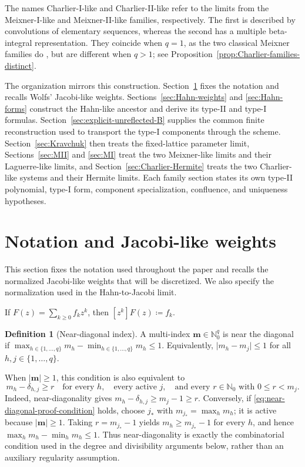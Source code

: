 \documentclass[10pt]{amsart}
\newcommand{\Nzero}{\mathbb N_0}
\newcommand{\mm}{\boldsymbol m}
\newcommand{\abs}[1]{\lvert#1\rvert}
\theoremstyle{plain}
\theoremstyle{definition}
\newtheorem{definition}[theorem]{Definition}
\theoremstyle{remark}
\begin{document}
The names Charlier-I-like and Charlier-II-like refer to the limits from the
Meixner-I-like and Meixner-II-like families, respectively. The first is
described by convolutions of elementary sequences, whereas the second has
a multiple beta-integral representation. They coincide when \(q=1\), as
the two classical Meixner families do
\cite{ArvesuCoussementVanAssche2003}, but are different when \(q>1\); see
Proposition~\ref{prop:Charlier-families-distinct}.

The organization mirrors this construction.
Section~\ref{sec:preliminaries} fixes the notation and recalls Wolfs'
Jacobi-like weights. Sections~\ref{sec:Hahn-weights} and
\ref{sec:Hahn-forms} construct the Hahn-like ancestor and derive its
type-II and type-I formulas.
Section~\ref{sec:explicit-unreflected-B} supplies the common finite
reconstruction used to transport the type-I components through the
scheme. Section~\ref{sec:Kravchuk} then treats the fixed-lattice parameter
limit, Sections~\ref{sec:MII} and \ref{sec:MI} treat the two Meixner-like
limits and their Laguerre-like limits, and
Section~\ref{sec:Charlier-Hermite} treats the two Charlier-like systems
and their Hermite limits. Each family section states its own type-II
polynomial, type-I form, component specialization, confluence, and
uniqueness hypotheses.

\section{Notation and Jacobi-like weights}
\label{sec:preliminaries}

This section fixes the notation used throughout the paper and recalls the
normalized Jacobi-like weights that will be discretized. We also specify the
normalization used in the Hahn-to-Jacobi limit.

If \(F(z)=\sum_{k\ge0}f_kz^k\), then \([z^k]F(z)\coloneq f_k\).

\begin{definition}[Near-diagonal index]
A multi-index \(\mm\in\Nzero^q\) is near the diagonal if
\(\max_{h\in\{1,\ldots,q\}}m_h-
\min_{h\in\{1,\ldots,q\}}m_h\le1\).
Equivalently, \(\abs{m_h-m_j}\le1\) for all
\(h,j\in\{1,\ldots,q\}\).
\end{definition}

When \(\abs\mm\ge1\), this condition is also equivalent to
\begin{equation}
 m_h-\delta_{h,j}\ge r
 \quad\text{for every }h,
 \quad\text{every active }j,
 \quad\text{and every }r\in\Nzero\text{ with }0\le r<m_j.
 \label{eq:near-diagonal-proof-condition}
\end{equation}
Indeed, near-diagonality gives
\(m_h-\delta_{h,j}\ge m_j-1\ge r\). Conversely, if
\eqref{eq:near-diagonal-proof-condition} holds, choose \(j_*\) with
\(m_{j_*}=\max_hm_h\); it is active because \(\abs\mm\ge1\). Taking
\(r=m_{j_*}-1\) yields \(m_h\ge m_{j_*}-1\) for every \(h\), and hence
\(\max_hm_h-\min_hm_h\le1\).
Thus near-diagonality is exactly the combinatorial condition used in the
degree and divisibility arguments below, rather than an auxiliary
regularity assumption.
\end{document}

